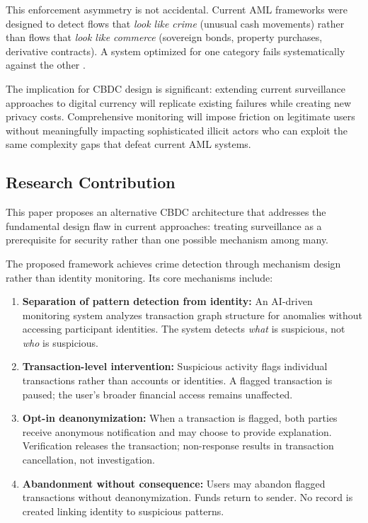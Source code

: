 \documentclass[11pt]{article}
\begin{document}
This enforcement asymmetry is not accidental. Current AML frameworks were designed to detect flows that \textit{look like crime} (unusual cash movements) rather than flows that \textit{look like commerce} (sovereign bonds, property purchases, derivative contracts). A system optimized for one category fails systematically against the other \citep{Kang2018}.

The implication for CBDC design is significant: extending current surveillance approaches to digital currency will replicate existing failures while creating new privacy costs. Comprehensive monitoring will impose friction on legitimate users without meaningfully impacting sophisticated illicit actors who can exploit the same complexity gaps that defeat current AML systems.

\subsection{Research Contribution}

This paper proposes an alternative CBDC architecture that addresses the fundamental design flaw in current approaches: treating surveillance as a prerequisite for security rather than one possible mechanism among many.

The proposed framework achieves crime detection through mechanism design rather than identity monitoring. Its core mechanisms include:

\begin{enumerate}
    \item \textbf{Separation of pattern detection from identity:} An AI-driven monitoring system analyzes transaction graph structure for anomalies without accessing participant identities. The system detects \textit{what} is suspicious, not \textit{who} is suspicious.

    \item \textbf{Transaction-level intervention:} Suspicious activity flags individual transactions rather than accounts or identities. A flagged transaction is paused; the user's broader financial access remains unaffected.

    \item \textbf{Opt-in deanonymization:} When a transaction is flagged, both parties receive anonymous notification and may choose to provide explanation. Verification releases the transaction; non-response results in transaction cancellation, not investigation.

    \item \textbf{Abandonment without consequence:} Users may abandon flagged transactions without deanonymization. Funds return to sender. No record is created linking identity to suspicious patterns.
\end{enumerate}
\end{document}
